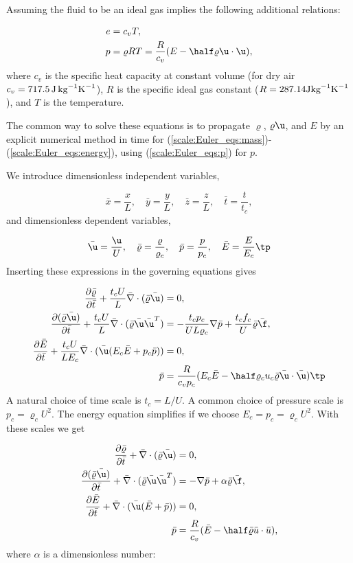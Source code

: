 \documentclass[graybox,envcountchap,sectrefs,final]{svmonodo}
\begin{document}
Assuming the fluid to be an ideal gas implies the following additional
relations:

\begin{align}
e &= c_v T,
\label{scale:Euler_eqs:e}\\ 
p &= \varrho RT = \frac{R}{c_v}(E-\half\varrho \u\cdot\u),
\label{scale:Euler_eqs:p}
\end{align}
where $c_v$ is the specific heat capacity at constant volume (for dry air
$c_v = 717.5\, \hbox{J}\,\hbox{kg}^{-1}\hbox{K}^{-1}$),
$R$ is the specific ideal gas constant
($R=287.14 \hbox{J}\hbox{kg}^{-1}\hbox{K}^{-1}$), and $T$ is the temperature.

The common way to solve these equations is to propagate $\varrho$,
$\varrho\u$, and $E$ by an explicit numerical method in time for
(\ref{scale:Euler_eqs:mass})-(\ref{scale:Euler_eqs:energy}),
using (\ref{scale:Euler_eqs:p}) for $p$.


We introduce dimensionless independent variables,

\[ \bar x = \frac{x}{L},\quad \bar y = \frac{y}{L},\quad \bar z = \frac{z}{L},
\quad \bar t = \frac{t}{t_c},\]
and dimensionless dependent variables,

\[ \bar\u = \frac{\u}{U},\quad\bar\varrho = \frac{\varrho}{\varrho_c},
\quad\bar p = \frac{p}{p_c},\quad \bar E= \frac{E}{E_c}\tp\]
Inserting these expressions in the governing equations gives

\begin{align*}
\frac{\partial\bar\varrho}{\partial\bar t} + \frac{t_c U}{L}\bar\nabla\cdot(\bar\varrho\bar\u) &= 0,\\ 
\frac{\partial(\bar\varrho\bar\u)}{\partial\bar t} + \frac{t_cU}{L}\bar\nabla\cdot(\bar\varrho\bar\u\bar\u^T) &= -\frac{t_cp_c}{UL\varrho_c}\nabla\bar p + \frac{t_c f_c}{U}\bar\varrho \bar\f,\\ 
\frac{\partial\bar E}{\partial\bar t} + \frac{t_c U}{LE_c }\bar\nabla\cdot(\bar\u(E_c\bar E+p_c\bar p)) &= 0,\\ 
\bar p & = \frac{R}{c_v p_c}(E_c\bar E - \half\varrho_cu_c\bar\varrho\bar\u\cdot\bar\u)\tp
\end{align*}
A natural choice of time scale is $t_c=L/U$. A common choice of
pressure scale is $p_c=\varrho_c U^2$. The energy equation simplifies if
we choose $E_c=p_c=\varrho_c U^2$. With these scales we get

\begin{align*}
\frac{\partial\bar\varrho}{\partial\bar t} +
\bar\nabla\cdot(\bar\varrho\bar\u) &= 0,\\ 
\frac{\partial(\bar\varrho\bar\u)}{\partial\bar t} +
\bar\nabla\cdot(\bar\varrho\bar\u\bar\u^T) &=
-\nabla\bar p + \alpha\bar\varrho \bar\f,\\ 
\frac{\partial\bar E}{\partial\bar t} +
\bar\nabla\cdot(\bar\u(\bar E+ \bar p)) &= 0,\\ 
\bar p & = \frac{R}{c_v}(\bar E - \half\bar\varrho\bar u\cdot\bar u),
\end{align*}
where $\alpha$ is a dimensionless number:
\end{document}
